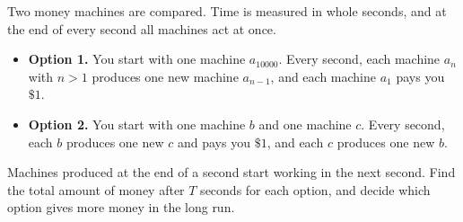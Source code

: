 Two money machines are compared. Time is measured in whole seconds, and at the end of every second all machines act at once.
\begin{itemize}
\item \textbf{Option 1.} You start with one machine $a_{10000}$. Every second, each machine $a_n$ with $n>1$ produces one new machine $a_{n-1}$, and each machine $a_1$ pays you $\$1$.
\item \textbf{Option 2.} You start with one machine $b$ and one machine $c$. Every second, each $b$ produces one new $c$ and pays you $\$1$, and each $c$ produces one new $b$.
\end{itemize}
Machines produced at the end of a second start working in the next second. Find the total amount of money after $T$ seconds for each option, and decide which option gives more money in the long run.
